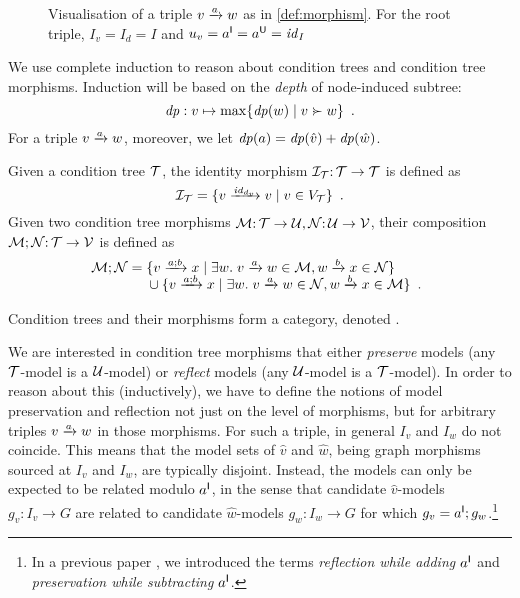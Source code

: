 \begin{figure}
\centering

\caption{Visualisation of a triple $\trip vaw$ as in \cref{def:morphism}. For the root triple, $I_v=I_d=I$ and $u_v=a^{\mathsf I}=a^{\mathsf U}={\mathit{id}}_I$}
\label{fig:triple}
\end{figure}

We use complete induction to reason about condition trees and condition tree morphisms. Induction will be based on the \emph{depth} of node-induced subtree:
%
\[ \depth: v\mapsto \max \gensetof{\depth(w)}{v\childof w} \enspace. \]
%
For a triple $\trip vaw$, moreover, we let ${\mathit{dp}}(a)={\mathit{dp}}(\hat v)+{\mathit{dp}}(\hat w)$.

\medskip\noindent
Given a condition tree ${\mathcal{T}}$, the identity morphism ${\mathcal{I}}_{\mathcal{T}}{:}\, {\mathcal{T}}\rightarrow{\mathcal{T}}$ is defined as
\[ \cI_\cT = \setof{\trip v{\id_{d_v}}v \mid v\in V_\cT} \enspace. \]
Given two condition tree morphisms ${\mathcal{M}}{:}\, {\mathcal{T}}\rightarrow {\mathcal{U}},{\mathcal{N}}{:}\, {\mathcal{U}}\rightarrow {\mathcal{V}}$, their composition ${\mathcal{M}};{\mathcal{N}}{:}\, {\mathcal{T}}\rightarrow {\mathcal{V}}$ is defined as
\[ \cM;\cN =
\begin{array}[t]{@{}l}
	\setof{\trip v{a;b}x \mid \exists w\st \trip v a w\in\cM, \trip wbx\in \cN} \\
	{}\cup \setof{\trip v{a;b}x \mid \exists w\st \trip vaw\in\cN, \trip wbx\in\cM} \enspace.
\end{array}
\]

\begin{proposition}
Condition trees and their morphisms form a category, denoted {\CT}.
\end{proposition}
%
We are interested in condition tree morphisms that either \emph{preserve} models (any ${\mathcal{T}}$-model is a ${\mathcal{U}}$-model) or \emph{reflect} models (any ${\mathcal{U}}$-model is a ${\mathcal{T}}$-model). In order to reason about this (inductively), we have to define the notions of model preservation and reflection not just on the level of morphisms, but for arbitrary triples $\trip vaw$ in those morphisms. For such a triple, in general $I_v$ and $I_w$ do not coincide. This means that the model sets of $\hat v$ and $\hat w$, being graph morphisms sourced at $I_v$ and $I_w$, are typically disjoint. Instead, the models can only be expected to be related modulo $a^{\mathsf I}$, in the sense that candidate $\hat v$-models $g_v:I_v\to G$ are related to candidate $\hat w$-models $g_w:I_w\to G$ for which $g_v=a^{\mathsf I};g_w$.\footnote{In a previous paper \cite{RensCorr}, we introduced the terms \emph{reflection while adding $a^{\mathsf I}$} and \emph{preservation while subtracting $a^{\mathsf I}$}.}

